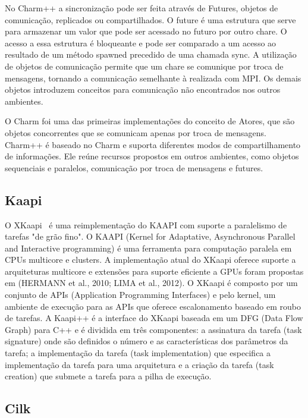 No Charm++ a sincronização pode ser feita através de Futures, objetos de comunicação, replicados ou compartilhados. O future  é uma estrutura que serve para armazenar um valor que pode ser acessado no futuro por outro chare. O acesso a essa estrutura  é bloqueante e pode ser comparado a um acesso ao resultado de um método spawned precedido de uma chamada sync. A utilização de objetos de comunicação permite que um chare se comunique por troca de mensagens, tornando a comunicação semelhante à realizada com MPI. Os demais objetos introduzem conceitos para comunicação não encontrados nos outros ambientes.

O Charm foi uma das primeiras implementações do conceito de Atores, que são objetos concorrentes que se comunicam apenas por troca de mensagens. Charm++ é baseado no Charm e suporta diferentes modos de compartilhamento de informações. Ele reúne recursos propostos em outros ambientes, como objetos sequenciais e paralelos, comunicação por troca de mensagens e futures. 

\subsection{Kaapi}

O XKaapi~\cite{gautier:hal-00799904} é uma reimplementação do KAAPI com suporte a paralelismo de tarefas "de grão fino". O KAAPI (Kernel for Adaptative, Asynchronous Parallel and Interactive programming) é uma ferramenta para computação paralela em CPUs multicore e clusters. A implementação atual do XKaapi oferece suporte a arquiteturas multicore e extensões para suporte eficiente a GPUs foram propostas em (HERMANN et al., 2010; LIMA et al., 2012). O XKaapi é composto por um conjunto de APIs (Application Programming Interfaces) e pelo kernel, um ambiente de execução para as APIs que oferece escalonamento baseado em roubo de tarefas. A Kaapi++ é a interface do XKaapi baseada em um DFG (Data Flow Graph) para C++ e é dividida em três componentes: a assinatura da tarefa (task signature) onde são definidos o número e as características dos parâmetros da tarefa; a implementação da tarefa (task implementation) que especifica a implementação da tarefa para uma arquitetura e a criação da tarefa (task creation) que submete a tarefa para a pilha de execução.

\subsection{Cilk}

